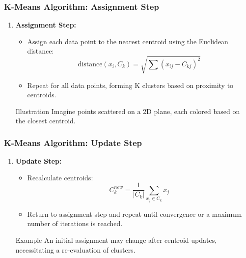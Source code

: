 \documentclass[aspectratio=169]{beamer}
\begin{document}
\begin{frame}[fragile]
    \frametitle{K-Means Algorithm: Assignment Step}
    \begin{enumerate}[resume]
        \item \textbf{Assignment Step:}
        \begin{itemize}
            \item Assign each data point to the nearest centroid using the Euclidean distance:
            \begin{equation}
                \text{distance}(x_i, C_k) = \sqrt{\sum (x_{ij} - C_{kj})^2}
            \end{equation}
            \item Repeat for all data points, forming K clusters based on proximity to centroids.
        \end{itemize}
        
        \begin{block}{Illustration}
            Imagine points scattered on a 2D plane, each colored based on the closest centroid.
        \end{block}
    \end{enumerate}
\end{frame}

\begin{frame}[fragile]
    \frametitle{K-Means Algorithm: Update Step}
    \begin{enumerate}[resume]
        \item \textbf{Update Step:}
        \begin{itemize}
            \item Recalculate centroids:
            \begin{equation}
                C_k^{new} = \frac{1}{|C_k|} \sum_{x_j \in C_k} x_j
            \end{equation}
            \item Return to assignment step and repeat until convergence or a maximum number of iterations is reached.
        \end{itemize}
        
        \begin{block}{Example}
            An initial assignment may change after centroid updates, necessitating a re-evaluation of clusters.
        \end{block}
    \end{enumerate}
\end{frame}
\end{document}
